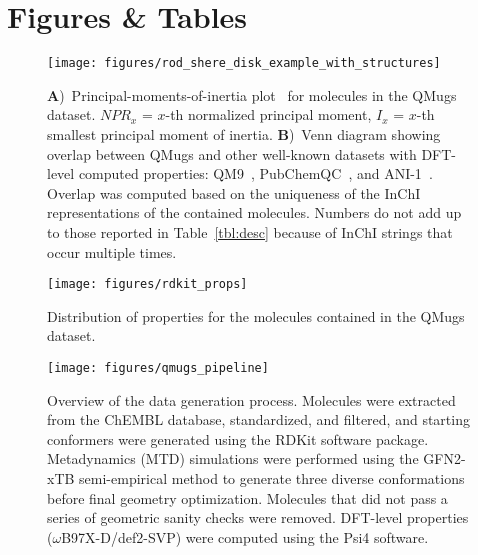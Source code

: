 \section*{Figures \& Tables}

\begin{figure}[ht]
\centering
\texttt{[image: figures/rod\_shere\_disk\_example\_with\_structures]}
\caption{\textbf{A})~Principal-moments-of-inertia plot~\cite{sauer2003molecular} for molecules in the QMugs dataset. $NPR_x$ = $x$-th normalized principal moment, $I_x$ = $x$-th smallest principal moment of inertia.
\textbf{B})~Venn diagram showing overlap between QMugs and other well-known datasets with DFT-level computed properties: QM9~\cite{ramakrishnan2014quantum}, PubChemQC~\cite{nakata2017pubchemqc}, and ANI-1~\cite{smith2017anid}. Overlap was computed based on the uniqueness of the InChI representations of the contained molecules. Numbers do not add up to those reported in Table~\ref{tbl:desc} because of InChI strings that occur multiple times.}
\label{fig:rod_disk_sphere_venn}
\end{figure}


\begin{figure}[ht]
\centering
\texttt{[image: figures/rdkit\_props]}
\caption{Distribution of properties for the molecules contained in the QMugs dataset.}
\label{fig:molecule_props}
\end{figure}


\begin{figure}[ht]
\centering
\texttt{[image: figures/qmugs\_pipeline]}
\caption{Overview of the data generation process. Molecules were extracted from the ChEMBL database, standardized, and filtered, and starting conformers were generated using the RDKit software package. Metadynamics (MTD) simulations were performed using the GFN2-xTB semi-empirical method to generate three diverse conformations before final geometry optimization. Molecules that did not pass a series of geometric sanity checks were removed. DFT-level properties ($\omega$B97X-D/def2-SVP) were computed using the Psi4 software.}
\label{fig:pipeline}
\end{figure}



